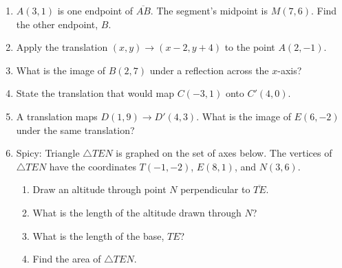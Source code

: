 \documentclass[12pt, twoside]{article}
\begin{document}
\begin{enumerate}
\newpage

    \item $A(3,1)$ is one endpoint of $\overline{AB}$. The segment's midpoint is $M(7,6)$. Find the other endpoint, $B$. \vspace{6cm}

    \item Apply the translation $(x,y) \rightarrow (x-2,y+4)$ to the point $A(2,-1)$. \vspace{2cm}
    \item What is the image of $B(2,7)$ under a reflection across the $x$-axis? \vspace{2cm}
    \item State the translation that would map $C(-3,1)$ onto $C'(4,0)$. \vspace{4cm}
    \item A translation maps $D(1,9) \rightarrow D'(4,3)$. What is the image of $E(6,-2)$ under the same translation?  \vspace{3cm}

\newpage

  \item Spicy: Triangle $\triangle TEN$ is graphed on the set of axes below. The vertices of $\triangle TEN$ have the coordinates $T(-1,-2)$, $E(8,1)$, and $N(3,6)$.
    \begin{center} %
    \end{center}
    \begin{enumerate}
      \item Draw an altitude through point $N$ perpendicular to $\overline{TE}$.
      \item What is the length of the altitude drawn through $N$? \vspace{3.5cm}
      \item What is the length of the base, $TE$?  \vspace{3.5cm}
      \item Find the area of  $\triangle TEN$.
    \end{enumerate}


  \end{enumerate}

  
\end{document}
